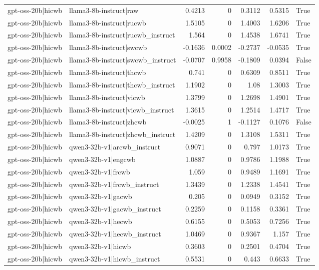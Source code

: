 \begin{table}
\begin{tabular}{l l r r r r l}
gpt-oss-20b|hicwb & llama3-8b-instruct|raw & 0.4213 & 0 & 0.3112 & 0.5315 & True \\
gpt-oss-20b|hicwb & llama3-8b-instruct|rucwb & 1.5105 & 0 & 1.4003 & 1.6206 & True \\
gpt-oss-20b|hicwb & llama3-8b-instruct|rucwb_instruct & 1.564 & 0 & 1.4538 & 1.6741 & True \\
gpt-oss-20b|hicwb & llama3-8b-instruct|swcwb & -0.1636 & 0.0002 & -0.2737 & -0.0535 & True \\
gpt-oss-20b|hicwb & llama3-8b-instruct|swcwb_instruct & -0.0707 & 0.9958 & -0.1809 & 0.0394 & False \\
gpt-oss-20b|hicwb & llama3-8b-instruct|thcwb & 0.741 & 0 & 0.6309 & 0.8511 & True \\
gpt-oss-20b|hicwb & llama3-8b-instruct|thcwb_instruct & 1.1902 & 0 & 1.08 & 1.3003 & True \\
gpt-oss-20b|hicwb & llama3-8b-instruct|vicwb & 1.3799 & 0 & 1.2698 & 1.4901 & True \\
gpt-oss-20b|hicwb & llama3-8b-instruct|vicwb_instruct & 1.3615 & 0 & 1.2514 & 1.4717 & True \\
gpt-oss-20b|hicwb & llama3-8b-instruct|zhcwb & -0.0025 & 1 & -0.1127 & 0.1076 & False \\
gpt-oss-20b|hicwb & llama3-8b-instruct|zhcwb_instruct & 1.4209 & 0 & 1.3108 & 1.5311 & True \\
gpt-oss-20b|hicwb & qwen3-32b-v1|arcwb_instruct & 0.9071 & 0 & 0.797 & 1.0173 & True \\
gpt-oss-20b|hicwb & qwen3-32b-v1|engcwb & 1.0887 & 0 & 0.9786 & 1.1988 & True \\
gpt-oss-20b|hicwb & qwen3-32b-v1|frcwb & 1.059 & 0 & 0.9489 & 1.1691 & True \\
gpt-oss-20b|hicwb & qwen3-32b-v1|frcwb_instruct & 1.3439 & 0 & 1.2338 & 1.4541 & True \\
gpt-oss-20b|hicwb & qwen3-32b-v1|gacwb & 0.205 & 0 & 0.0949 & 0.3152 & True \\
gpt-oss-20b|hicwb & qwen3-32b-v1|gacwb_instruct & 0.2259 & 0 & 0.1158 & 0.3361 & True \\
gpt-oss-20b|hicwb & qwen3-32b-v1|hecwb & 0.6155 & 0 & 0.5053 & 0.7256 & True \\
gpt-oss-20b|hicwb & qwen3-32b-v1|hecwb_instruct & 1.0469 & 0 & 0.9367 & 1.157 & True \\
gpt-oss-20b|hicwb & qwen3-32b-v1|hicwb & 0.3603 & 0 & 0.2501 & 0.4704 & True \\
gpt-oss-20b|hicwb & qwen3-32b-v1|hicwb_instruct & 0.5531 & 0 & 0.443 & 0.6633 & True \\

\end{tabular}
\end{table}
